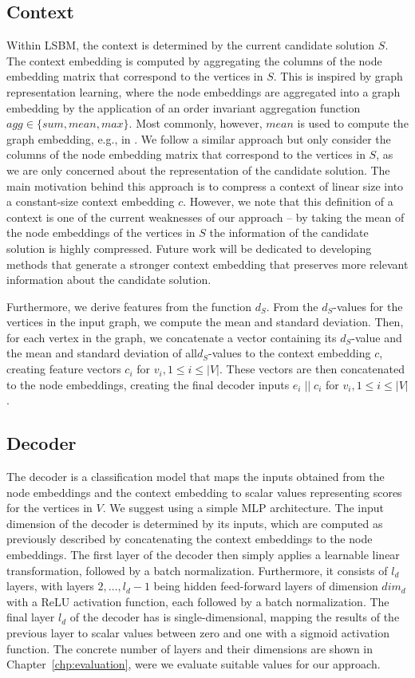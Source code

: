 \documentclass[draft,final]{vutinfth} %
\begin{document}
\subsection{Context}
Within LSBM, the context is determined by the current candidate solution $S$. The context embedding is computed by aggregating the columns of the node embedding matrix that correspond to the vertices in $S$. 
This is inspired by graph representation learning, where the node embeddings are aggregated into a graph embedding by the application of an order invariant aggregation function $\mathit{agg} \in \{\mathit{sum, mean, max}\}$. Most commonly, however, $\mathit{mean}$ is used to compute the graph embedding, e.g., in \cite{Kool2019}. 
We follow a similar approach but only consider the columns of the node embedding matrix that correspond to the vertices in $S$, as we are only concerned about the representation of the candidate solution. 
The main motivation behind this approach is to compress a context of linear size into a constant-size context embedding $c$. 
However, we note that this definition of a context is one of the current weaknesses of our approach -- by taking the mean of the node embeddings of the vertices in $S$ the information of the candidate solution is highly compressed. Future work will be dedicated to developing methods that generate a stronger context embedding that preserves more relevant information about the candidate solution. 

Furthermore, we derive features from the function $d_S$. From the $d_S$-values for the vertices in the input graph, we compute the mean and standard deviation. Then, for each vertex in the graph, we concatenate a vector containing its $d_S$-value and the mean and standard deviation of all$d_S$-values to the context embedding $c$, creating feature vectors $c_i$ for $v_i, 1 \leq i \leq |V|$. These vectors are then concatenated to the node embeddings, creating the final decoder inputs $e_i \; || \; c_i$ for $v_i, 1 \leq i \leq |V|$. 

\subsection{Decoder}
The decoder is a classification model that maps the inputs obtained from the node embeddings and the context embedding to scalar values representing scores for the vertices in $V$. We suggest using a simple MLP architecture. The input dimension of the decoder is determined by its inputs, which are computed as previously described by concatenating the context embeddings to the node embeddings. The first layer of the decoder then simply applies a learnable linear transformation, followed by a batch normalization. Furthermore, it consists of $l_d$ layers, with layers $2, \dots, l_d - 1$ being hidden feed-forward layers  of dimension $\mathit{dim}_d$ with a ReLU activation function, each followed by a batch normalization. The final layer $l_d$ of the decoder has is single-dimensional, mapping the results of the previous layer to scalar values between zero and one with a sigmoid activation function. The concrete number of layers and their dimensions are shown in Chapter~\ref{chp:evaluation}, were we evaluate suitable values for our approach. 
\end{document}
